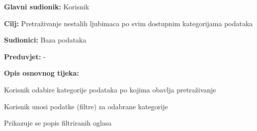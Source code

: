 					\noindent {}
					\begin{packed_item}
						
						\item \textbf{Glavni sudionik: }Korisnik
						\item  \textbf{Cilj:} Pretraživanje nestalih ljubimaca po svim dostupnim kategorijama podataka
						\item  \textbf{Sudionici:} Baza podataka
						\item  \textbf{Preduvjet:} -
						\item  \textbf{Opis osnovnog tijeka:}
						
						\item[] \begin{packed_enum}
							
							\item Korisnik odabire kategorije podataka po kojima obavlja pretraživanje
							\item Korisnik unosi podatke (filtre) za odabrane kategorije
							\item Prikazuje se popis filtriranih oglasa
						\end{packed_enum}
					\end{packed_item}
					
